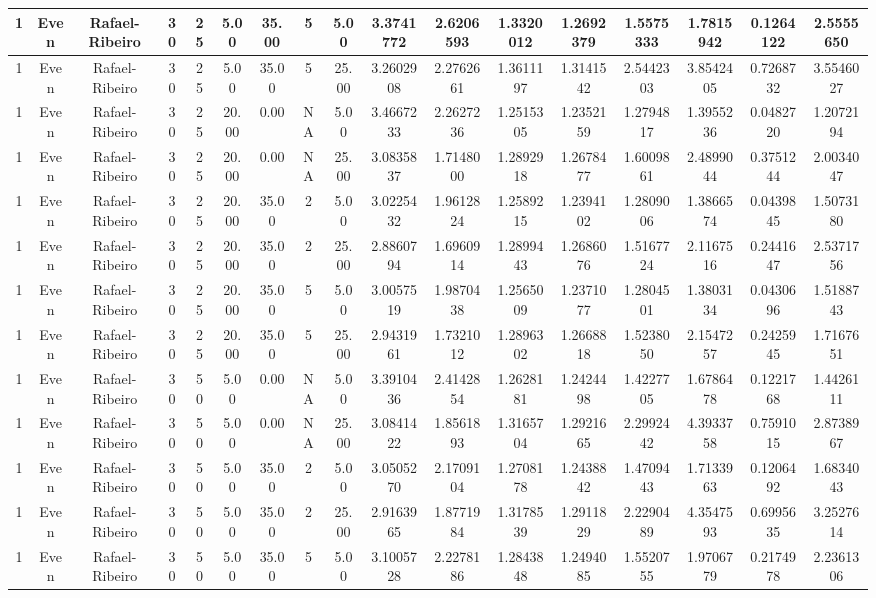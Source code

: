 \begin{longtable}{ | c | c | c | c | c | c | c | c | c | c | c | c | c | c | c | c | c | }
	\hline
	1	&	Even	&	Rafael-Ribeiro	&	30	&	25	&	5.00	&	35.00	&	5	&	5.00	&	3.3741772	&	2.6206593	&	1.3320012	&	1.2692379	&	1.5575333	&	1.7815942	&	0.1264122	&	2.5555650 \\
	\hline
	1	&	Even	&	Rafael-Ribeiro	&	30	&	25	&	5.00	&	35.00	&	5	&	25.00	&	3.2602908	&	2.2762661	&	1.3611197	&	1.3141542	&	2.5442303	&	3.8542405	&	0.7268732	&	3.5546027 \\
	\hline
	1	&	Even	&	Rafael-Ribeiro	&	30	&	25	&	20.00	&	0.00	&	NA	&	5.00	&	3.4667233	&	2.2627236	&	1.2515305	&	1.2352159	&	1.2794817	&	1.3955236	&	0.0482720	&	1.2072194 \\
	\hline
	1	&	Even	&	Rafael-Ribeiro	&	30	&	25	&	20.00	&	0.00	&	NA	&	25.00	&	3.0835837	&	1.7148000	&	1.2892918	&	1.2678477	&	1.6009861	&	2.4899044	&	0.3751244	&	2.0034047 \\
	\hline
	1	&	Even	&	Rafael-Ribeiro	&	30	&	25	&	20.00	&	35.00	&	2	&	5.00	&	3.0225432	&	1.9612824	&	1.2589215	&	1.2394102	&	1.2809006	&	1.3866574	&	0.0439845	&	1.5073180 \\
	\hline
	1	&	Even	&	Rafael-Ribeiro	&	30	&	25	&	20.00	&	35.00	&	2	&	25.00	&	2.8860794	&	1.6960914	&	1.2899443	&	1.2686076	&	1.5167724	&	2.1167516	&	0.2441647	&	2.5371756 \\
	\hline
	1	&	Even	&	Rafael-Ribeiro	&	30	&	25	&	20.00	&	35.00	&	5	&	5.00	&	3.0057519	&	1.9870438	&	1.2565009	&	1.2371077	&	1.2804501	&	1.3803134	&	0.0430696	&	1.5188743 \\
	\hline
	1	&	Even	&	Rafael-Ribeiro	&	30	&	25	&	20.00	&	35.00	&	5	&	25.00	&	2.9431961	&	1.7321012	&	1.2896302	&	1.2668818	&	1.5238050	&	2.1547257	&	0.2425945	&	1.7167651 \\
	\hline
	1	&	Even	&	Rafael-Ribeiro	&	30	&	50	&	5.00	&	0.00	&	NA	&	5.00	&	3.3910436	&	2.4142854	&	1.2628181	&	1.2424498	&	1.4227705	&	1.6786478	&	0.1221768	&	1.4426111 \\
	\hline
	1	&	Even	&	Rafael-Ribeiro	&	30	&	50	&	5.00	&	0.00	&	NA	&	25.00	&	3.0841422	&	1.8561893	&	1.3165704	&	1.2921665	&	2.2992442	&	4.3933758	&	0.7591015	&	2.8738967 \\
	\hline
	1	&	Even	&	Rafael-Ribeiro	&	30	&	50	&	5.00	&	35.00	&	2	&	5.00	&	3.0505270	&	2.1709104	&	1.2708178	&	1.2438842	&	1.4709443	&	1.7133963	&	0.1206492	&	1.6834043 \\
	\hline
	1	&	Even	&	Rafael-Ribeiro	&	30	&	50	&	5.00	&	35.00	&	2	&	25.00	&	2.9163965	&	1.8771984	&	1.3178539	&	1.2911829	&	2.2290489	&	4.3547593	&	0.6995635	&	3.2527614 \\
	\hline
	1	&	Even	&	Rafael-Ribeiro	&	30	&	50	&	5.00	&	35.00	&	5	&	5.00	&	3.1005728	&	2.2278186	&	1.2843848	&	1.2494085	&	1.5520755	&	1.9706779	&	0.2174978	&	2.2361306 \\

\end{longtable}
